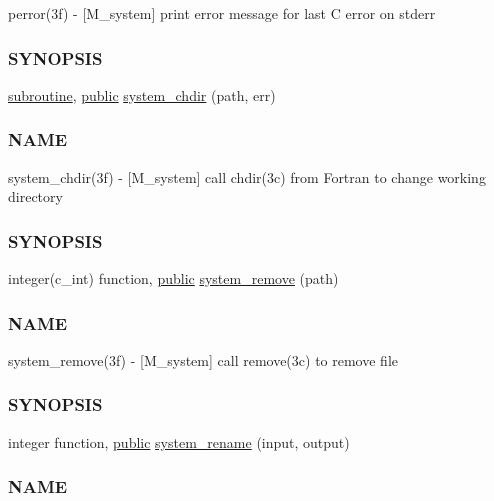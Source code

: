 \begin{DoxyCompactItemize}
\begin{DoxyCompactList}
perror(3f) -\/ \mbox{[}M\+\_\+system\mbox{]} print error message for last C error on stderr \subsubsection*{S\+Y\+N\+O\+P\+S\+IS}\end{DoxyCompactList}\item 
\hyperlink{M__stopwatch_83_8txt_acfbcff50169d691ff02d4a123ed70482}{subroutine}, \hyperlink{M__stopwatch_83_8txt_a2f74811300c361e53b430611a7d1769f}{public} \hyperlink{namespacem__system_a47746b670cb21bae0957c9bb2bccf209}{system\+\_\+chdir} (path, err)
\begin{DoxyCompactList}\small\item\em \subsubsection*{N\+A\+ME}

system\+\_\+chdir(3f) -\/ \mbox{[}M\+\_\+system\mbox{]} call chdir(3c) from Fortran to change working directory \subsubsection*{S\+Y\+N\+O\+P\+S\+IS}\end{DoxyCompactList}\item 
integer(c\+\_\+int) function, \hyperlink{M__stopwatch_83_8txt_a2f74811300c361e53b430611a7d1769f}{public} \hyperlink{namespacem__system_a730ae64294e3cd73bde8f0c63cdf9972}{system\+\_\+remove} (path)
\begin{DoxyCompactList}\small\item\em \subsubsection*{N\+A\+ME}

system\+\_\+remove(3f) -\/ \mbox{[}M\+\_\+system\mbox{]} call remove(3c) to remove file \subsubsection*{S\+Y\+N\+O\+P\+S\+IS}\end{DoxyCompactList}\item 
integer function, \hyperlink{M__stopwatch_83_8txt_a2f74811300c361e53b430611a7d1769f}{public} \hyperlink{namespacem__system_adfbaf3d17790da9ba0c520683d5b8003}{system\+\_\+rename} (input, output)
\begin{DoxyCompactList}\small\item\em \subsubsection*{N\+A\+ME}


\end{DoxyCompactList}
\end{DoxyCompactItemize}
